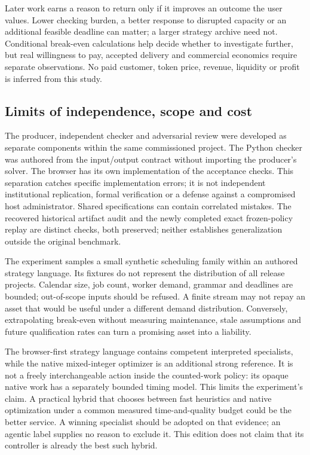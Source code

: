 Later work earns a reason to return only if it improves an outcome the user values. Lower checking burden, a better response to disrupted capacity or an additional feasible deadline can matter; a larger strategy archive need not. Conditional break-even calculations help decide whether to investigate further, but real willingness to pay, accepted delivery and commercial economics require separate observations. No paid customer, token price, revenue, liquidity or profit is inferred from this study.

\subsection{Limits of independence, scope and cost}

The producer, independent checker and adversarial review were developed as separate components within the same commissioned project. The Python checker was authored from the input/output contract without importing the producer's solver. The browser has its own implementation of the acceptance checks. This separation catches specific implementation errors; it is not independent institutional replication, formal verification or a defense against a compromised host administrator. Shared specifications can contain correlated mistakes. The recovered historical artifact audit and the newly completed exact frozen-policy replay are distinct checks, both preserved; neither establishes generalization outside the original benchmark.

The experiment samples a small synthetic scheduling family within an authored strategy language. Its fixtures do not represent the distribution of all release projects. Calendar size, job count, worker demand, grammar and deadlines are bounded; out-of-scope inputs should be refused. A finite stream may not repay an asset that would be useful under a different demand distribution. Conversely, extrapolating break-even without measuring maintenance, stale assumptions and future qualification rates can turn a promising asset into a liability.

The browser-first strategy language contains competent interpreted specialists, while the native mixed-integer optimizer is an additional strong reference. It is not a freely interchangeable action inside the counted-work policy: its opaque native work has a separately bounded timing model. This limits the experiment's claim. A practical hybrid that chooses between fast heuristics and native optimization under a common measured time-and-quality budget could be the better service. A winning specialist should be adopted on that evidence; an agentic label supplies no reason to exclude it. This edition does not claim that its controller is already the best such hybrid.


